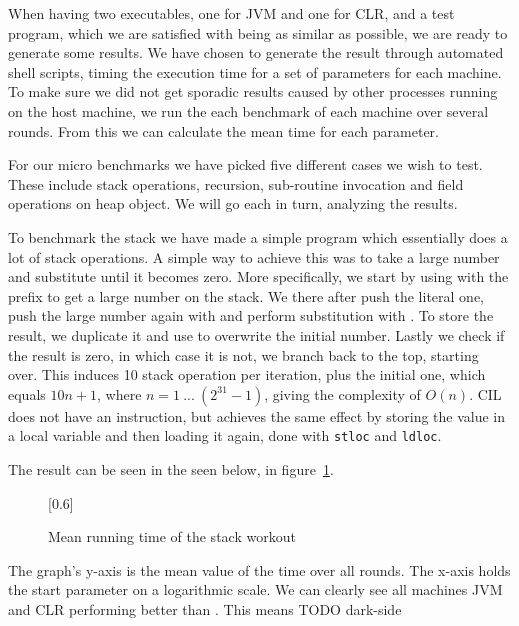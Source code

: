 When having two executables, one for JVM and one for CLR, and a \thename{} test
program, which we are satisfied with being as similar as possible, we are ready
to generate some results. We have chosen to generate the result through
automated shell scripts, timing the execution time for a set of parameters for
each machine. To make sure we did not get sporadic results caused by other
processes running on the host machine, we run the each benchmark of each machine
over several rounds. From this we can calculate the mean time for each
parameter.

For our micro benchmarks we have picked five different cases we wish to
test. These include stack operations, recursion, sub-routine invocation and
field operations on heap object. We will go each in turn, analyzing the results.


To benchmark the stack we have made a simple program which essentially does a
lot of stack operations. A simple way to achieve this was to take a large number
and substitute until it becomes zero. More specifically, we start by using
 with the  prefix to get a large number on the
stack. We there after push the literal one, push the large number again with
 and perform substitution with . To store the
result, we duplicate it and use  to overwrite the initial
number. Lastly we check if the result is zero, in which case it is not, we
branch back to the top, starting over. This induces 10 stack operation per
iteration, plus the initial one, which equals $10n + 1$, where
$n = 1\ ...\ (2^{31} -1)$, giving the complexity of $O(n)$. CIL does not have an
 instruction, but achieves the same effect by storing the
value in a local variable and then loading it again, done with {\tt stloc} and
{\tt ldloc}.

The result can be seen in the seen below, in
figure~\ref{fig:eval:benchmark:stack}.
\begin{figure}[H]
  \centering
  \scalebox{0.8}[0.6]{}
  \caption{Mean running time of the stack workout}
\label{fig:eval:benchmark:stack}
\end{figure}

The graph's y-axis is the mean value of the time over all rounds. The x-axis
holds the start parameter on a logarithmic scale. We can clearly see all
machines JVM and CLR performing better than \thename{}. This means TODO
dark-side

